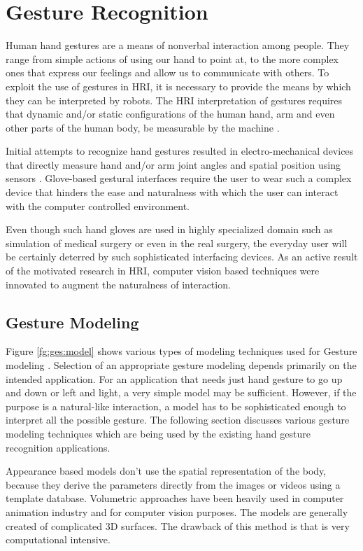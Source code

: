 \section{Gesture Recognition} Human hand gestures are a means of nonverbal interaction among people. They range from simple actions of using our hand to point at, to the more complex ones that express our feelings and allow us to communicate with others. To exploit the use of gestures in HRI, it is necessary to provide the means by which they can be interpreted by robots. The HRI interpretation of gestures requires that dynamic and/or static configurations of the human hand, arm and even other parts of the human body, be measurable by the machine \cite{1}. 

Initial attempts to recognize hand gestures resulted in electro-mechanical devices that directly measure hand and/or arm joint angles and spatial position using sensors \cite{3}. Glove-based gestural interfaces require the user to wear such a complex device that hinders the ease and naturalness with which the user can interact with the computer controlled environment. 

Even though such hand gloves are used in highly specialized domain such as simulation of medical surgery or even in the real surgery, the everyday user will be certainly deterred by such sophisticated interfacing devices. As an active result of the motivated research in HRI, computer vision based techniques were innovated to augment the naturalness of interaction.

\subsection{Gesture Modeling} Figure \ref{fg:ges:model} shows various types of modeling techniques used for Gesture modeling \cite{1}. Selection of an appropriate gesture modeling depends primarily on the intended application. For an application that needs just hand gesture to go up and down or left and light, a very simple model may be sufficient. However, if the purpose is a natural-like interaction, a model has to be sophisticated enough to interpret all the possible gesture. The following section discusses various gesture modeling techniques which are being used by the existing hand gesture recognition applications. 



Appearance based models don't use the spatial representation of the body, because they derive the parameters directly from the images or videos using a template database. Volumetric approaches have been heavily used in computer animation industry and for computer vision purposes. The models are generally created of complicated 3D surfaces. The drawback of this method is that is very computational intensive. 

